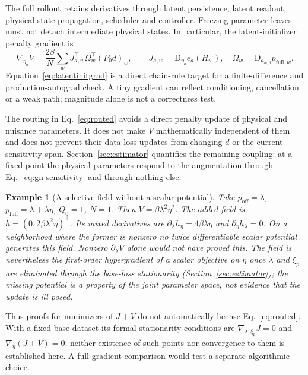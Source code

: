 \documentclass[11pt,a4paper]{article}
\newcommand{\D}{\mathrm D}
\newcommand{\full}{\mathrm{full}}
\newcommand{\off}{\mathrm{off}}
\newtheorem{example}[proposition]{Example}
\theoremstyle{remark}
\begin{document}
The full rollout retains derivatives through latent persistence, latent readout, physical state propagation, scheduler and controller. Freezing parameter leaves must not detach intermediate physical states. In particular, the latent-initializer penalty gradient is
\begin{equation}\label{eq:latentinitgrad}
 \nabla_{\eta_a}V=\frac{2\beta}{N}
 \sum_w J_{a,w}^\top\Omega_w^\top (P_0d)_w,
 \qquad J_{a,w}=\D_{\eta_a}e_a(H_w),\quad
 \Omega_w=\D_{a_{w,0}}p_{\full,w}.
\end{equation}
Equation~\eqref{eq:latentinitgrad} is a direct chain-rule target for a finite-difference and production-autograd check. A tiny gradient can reflect conditioning, cancellation or a weak path; magnitude alone is not a correctness test.

The routing in Eq.~\eqref{eq:routed} avoids a direct penalty update of physical and nuisance parameters. It does not make $V$ mathematically independent of them and does not prevent their data-loss updates from changing $d$ or the current sensitivity span. Section~\ref{sec:estimator} quantifies the remaining coupling: at a fixed point the physical parameters respond to the augmentation through Eq.~\eqref{eq:gn-sensitivity} and through nothing else.

\begin{example}[A selective field without a scalar potential]
Take $p_\off=\lambda$, $p_\full=\lambda+\lambda\eta$, $Q_0=1$, $N=1$. Then $V=\beta\lambda^2\eta^2$. The added field is $h=(0,2\beta\lambda^2\eta)^\top$. Its mixed derivatives are $\partial_\lambda h_\eta=4\beta\lambda\eta$ and $\partial_\eta h_\lambda=0$. On a neighborhood where the former is nonzero no twice differentiable scalar potential generates this field. Nonzero $\partial_\lambda V$ alone would not have proved this. The field is nevertheless the first-order hypergradient of a scalar objective on $\eta$ once $\lambda$ and $\xi_p$ are eliminated through the base-loss stationarity (Section~\ref{sec:estimator}); the missing potential is a property of the joint parameter space, not evidence that the update is ill posed.
\end{example}
Thus proofs for minimizers of $J+V$ do not automatically license Eq.~\eqref{eq:routed}. With a fixed base dataset its formal stationarity conditions are $\nabla_{\lambda,\xi_p}J=0$ and $\nabla_\eta(J+V)=0$; neither existence of such points nor convergence to them is established here. A full-gradient comparison would test a separate algorithmic choice.
\end{document}
